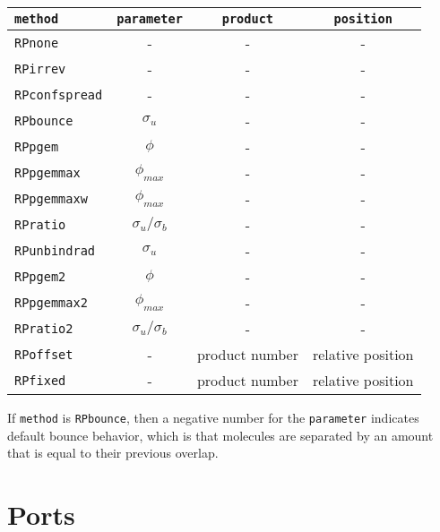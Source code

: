 \documentclass {book}
\newcommand {\ttt} {\texttt}
\begin{document}
\begin{description}
\begin{longtable}[c]{lccc}
\ttt{method} & \ttt{parameter} & \ttt{product} & \ttt{position}\\
\hline
\ttt{RPnone} & - & - & -\\
\ttt{RPirrev} & - & - & -\\
\ttt{RPconfspread} & - & - & -\\
\ttt{RPbounce} & $\sigma_u$ & - & -\\
\ttt{RPpgem} & $\phi$ & - & -\\
\ttt{RPpgemmax} & $\phi_{max}$ & - & -\\
\ttt{RPpgemmaxw} & $\phi_{max}$ & - & -\\
\ttt{RPratio} & $\sigma_u/\sigma_b$ & - & -\\
\ttt{RPunbindrad} & $\sigma_u$ & - & -\\
\ttt{RPpgem2} & $\phi$ & - & -\\
\ttt{RPpgemmax2} & $\phi_{max}$ & - & -\\
\ttt{RPratio2} & $\sigma_u/\sigma_b$ & - & -\\
\ttt{RPoffset} & - & product number & relative position\\
\ttt{RPfixed} & - & product number & relative position\\
\end{longtable}

If \ttt{method} is \ttt{RPbounce}, then a negative number for the \ttt{parameter} indicates default bounce behavior, which is that molecules are separated by an amount that is equal to their previous overlap.

\end{description}

\section{Ports}
\end{document}
